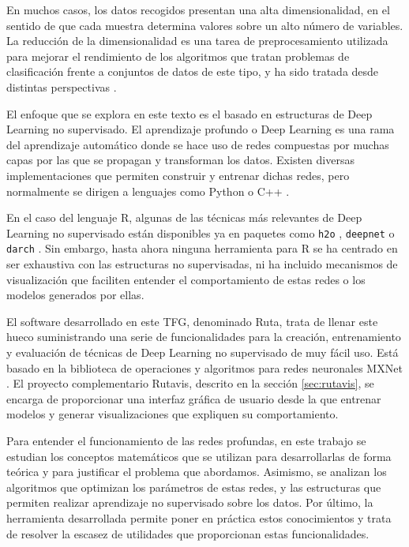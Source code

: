 En muchos casos, los datos recogidos presentan una alta dimensionalidad, en el sentido de que cada muestra determina valores sobre un alto número de variables. La reducción de la dimensionalidad es una tarea de preprocesamiento utilizada para mejorar el rendimiento de los algoritmos que tratan problemas de clasificación frente a conjuntos de datos de este tipo, y ha sido tratada desde distintas perspectivas \autocite{fodor2002}.

El enfoque que se explora en este texto es el basado en estructuras de Deep Learning no supervisado. El aprendizaje profundo o Deep Learning es una rama del aprendizaje automático donde se hace uso de redes compuestas por muchas capas por las que se propagan y transforman los datos. Existen diversas implementaciones que permiten construir y entrenar dichas redes, pero normalmente se dirigen a lenguajes como Python o C++ \autocite{tensorflow} \autocite{theano} \autocite{caffe}.

En el caso del lenguaje R, algunas de las técnicas más relevantes de Deep Learning no supervisado
están disponibles ya en paquetes como \texttt{h2o} \autocite{h2o},
\texttt{deepnet} \autocite{deepnet} o \texttt{darch} \autocite{darch}. Sin embargo, hasta ahora ninguna herramienta para R se ha centrado en ser exhaustiva con las estructuras no supervisadas, ni ha incluido mecanismos de visualización que faciliten entender el comportamiento de
estas redes o los modelos generados por ellas.

El software desarrollado en este TFG, denominado Ruta, trata de llenar este hueco suministrando una serie de funcionalidades para la creación, entrenamiento y evaluación de técnicas de Deep Learning no supervisado de muy fácil uso. Está basado en la biblioteca de operaciones y algoritmos para redes neuronales MXNet \autocite{mxnet}. El proyecto complementario Rutavis, descrito en la sección \ref{sec:rutavis}, se encarga de proporcionar una interfaz gráfica de usuario desde la que entrenar modelos y generar visualizaciones que expliquen su comportamiento.

Para entender el funcionamiento de las redes profundas, en este trabajo se estudian los conceptos matemáticos que se utilizan para desarrollarlas de forma teórica y para justificar el problema que abordamos. Asimismo, se analizan los algoritmos que optimizan los parámetros de estas redes, y las estructuras que permiten realizar aprendizaje no supervisado sobre los datos. Por último, la herramienta desarrollada permite poner en práctica estos conocimientos y trata de resolver la escasez de utilidades que proporcionan estas funcionalidades.

